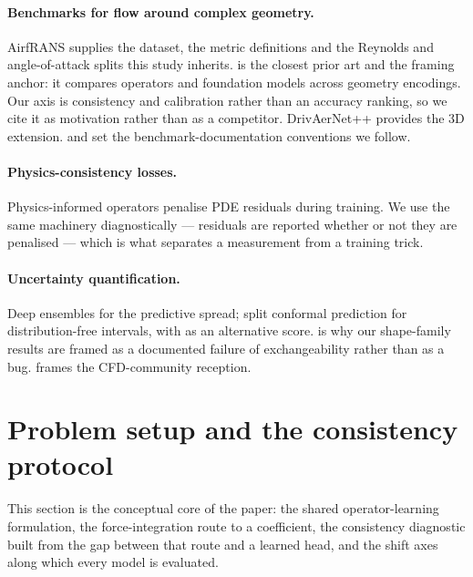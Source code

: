 \documentclass[11pt,a4paper]{article}
\begin{document}
\paragraph{Benchmarks for flow around complex geometry.}
AirfRANS \citep{bonnet2022airfrans} supplies the dataset, the metric definitions
and the Reynolds and angle-of-attack splits this study inherits.
\citet{rabeh2025benchmarking} is the closest prior art and the framing anchor: it
compares operators and foundation models across geometry encodings. Our axis is
consistency and calibration rather than an accuracy ranking, so we cite it as
motivation rather than as a competitor. DrivAerNet++ \citep{elrefaie2024drivaernetpp}
provides the 3D extension. \citet{takamoto2022pdebench} and
\citet{ohana2024thewell} set the benchmark-documentation conventions we follow.

\paragraph{Physics-consistency losses.}
Physics-informed operators \citep{li2021pino} penalise PDE residuals during
training. We use the same machinery diagnostically --- residuals are reported
whether or not they are penalised --- which is what separates a measurement from
a training trick.

\paragraph{Uncertainty quantification.}
Deep ensembles \citep{lakshminarayanan2017ensembles} for the predictive spread;
split conformal prediction \citep{angelopoulos2021gentle, vovk2005algorithmic,
lei2018distributionfree} for distribution-free intervals, with
\citet{romano2019cqr} as an alternative score. \citet{tibshirani2019covariateshift}
is why our shape-family results are framed as a documented failure of
exchangeability rather than as a bug.
\citet{vinuesa2022enhancing} frames the CFD-community reception.

\section{Problem setup and the consistency protocol}
\label{sec:protocol}

This section is the conceptual core of the paper: the shared operator-learning
formulation, the force-integration route to a coefficient, the consistency
diagnostic built from the gap between that route and a learned head, and the
shift axes along which every model is evaluated.
\end{document}
